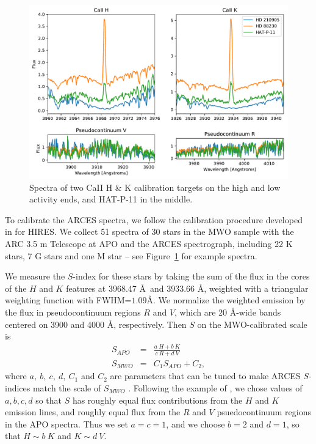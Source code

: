 \begin{figure}
\centering
\includegraphics[scale=0.7]{sindex/example_spectra.pdf}
\caption{Spectra of two CaII H \& K calibration targets on the high and low activity ends, and HAT-P-11 in the middle.}
\label{fig:examplespectra}
\end{figure}

To calibrate the ARCES spectra, we follow the calibration procedure developed in \citet{Isaacson2010} for HIRES. We collect 51 spectra of 30 stars in the \citet{Duncan1991} MWO sample with the ARC 3.5 m Telescope at APO and the ARCES spectrograph, including 22 K stars, 7 G stars and one M star -- see Figure~\ref{fig:examplespectra} for example spectra. 

We measure the $S$-index for these stars by taking the sum of the flux in the cores of the $H$ and $K$ features at 3968.47 \AA\ and 3933.66 \AA, weighted with a triangular weighting function with FWHM=$1.09$\AA. We normalize the weighted emission by the flux in pseudocontinuum regions $R$ and $V$, which are 20 \AA-wide bands centered on 3900 and 4000 \AA, respectively. Then $S$ on the MWO-calibrated scale is 
\begin{eqnarray}
S_{APO} &=& \frac{a~H + b~K}{c~R + d~V} \\
S_{MWO} &=& C_1 S_{APO} + C_2, \label{eqn:s_ind}
\end{eqnarray}
where $a,~b,~c,~d, ~C_1$ and $C_2$ are parameters that can be tuned to make ARCES $S$-indices match the scale of $S_{MWO}$ \citep{Duncan1991}. Following the example of \citet{Isaacson2010}, we chose values of $a,b,c,d$ so that $S$ has roughly equal flux contributions from the $H$ and $K$ emission lines, and roughly equal flux from the $R$ and $V$ psuedocontinuum regions in the APO spectra. Thus we set $a = c = 1$, and we choose $b=2$ and $d=1$, so that $H \sim b~K$ and $K \sim d~V$. 

